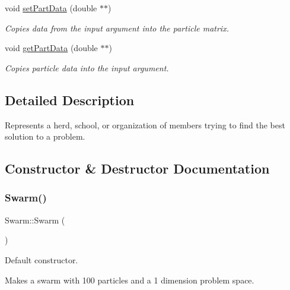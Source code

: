\begin{DoxyCompactItemize}
\mbox{\label{classSwarm_a1ab190eac2e0740bc16a51933c53c540}} 
void \mbox{\hyperlink{classSwarm_a1ab190eac2e0740bc16a51933c53c540}{set\+Part\+Data}} (double $\ast$$\ast$)
\begin{DoxyCompactList}\small\item\em Copies data from the input argument into the particle matrix. \end{DoxyCompactList}\item 
\mbox{\label{classSwarm_ac127974af7fdf64c8e2879e531d36c4b}} 
void \mbox{\hyperlink{classSwarm_ac127974af7fdf64c8e2879e531d36c4b}{get\+Part\+Data}} (double $\ast$$\ast$)
\begin{DoxyCompactList}\small\item\em Copies particle data into the input argument. \end{DoxyCompactList}\end{DoxyCompactItemize}


\subsection{Detailed Description}
Represents a herd, school, or organization of members trying to find the best solution to a problem. 

\subsection{Constructor \& Destructor Documentation}
\mbox{\label{classSwarm_a35a9ddd3e07819b46badca515be25e6d}} 
\subsubsection{\texorpdfstring{Swarm()}{Swarm()}\hspace{0.1cm}{\footnotesize\ttfamily [1/2]}}
{\footnotesize\ttfamily Swarm\+::\+Swarm (\begin{DoxyParamCaption}{ }\end{DoxyParamCaption})}



Default constructor. 

Makes a swarm with 100 particles and a 1 dimension problem space. \mbox{\label{classSwarm_a1b01d9f7d5730111670d94a368e74dd8}} 

